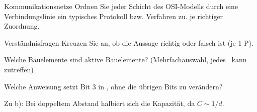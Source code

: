 \documentclass{uebungsblatt}
\begin{document}
\begin{aufgabe}[5]{Kommunikationsnetze}
Ordnen Sie jeder Schicht des OSI-Modells durch eine Verbindungslinie ein
typisches Protokoll bzw. Verfahren zu.  je richtiger Zuordnung.

\begin{zuordnung}
\end{zuordnung}
\end{aufgabe}

\begin{aufgabe}{Verständnisfragen}
Kreuzen Sie an, ob die Aussage richtig oder falsch ist (je 1 P).

\begin{ankreuzen}[1]
\end{ankreuzen}

\begin{teilaufgaben}
   Welche Bauelemente sind aktive Bauelemente?
           (Mehrfachauswahl, jedes \kaestchen\ kann zutreffen)
    \begin{antworten}[spalten=2]
    \end{antworten}
   Welche Anweisung setzt Bit 3 in , ohne die
           übrigen Bits zu verändern?
    \begin{antworten}[typ=einfach]
    \end{antworten}
\end{teilaufgaben}

\begin{loesung}[Begründung]
Zu b): Bei doppeltem Abstand halbiert sich die Kapazität, da $C \sim 1/d$.
\end{loesung}
\end{aufgabe}
\end{document}
